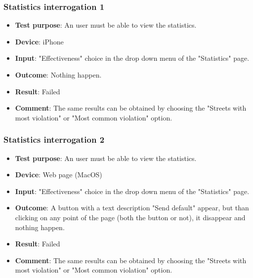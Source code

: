 \documentclass[../ATD.tex]{subfiles}
\begin{document}
    \subsubsection{Statistics interrogation 1}\label{subsubsec:statistics-interrogation-1}
    \begin{itemize}
        \item \textbf{Test purpose}: An user must be able to view the statistics.
        \item \textbf{Device}: iPhone
        \item \textbf{Input}: "Effectiveness" choice in the drop down menu of the "Statistics" page.
        \item \textbf{Outcome}: Nothing happen.
        \item \textbf{Result}: Failed
        \item \textbf{Comment}: The same results can be obtained by choosing the "Streets with most violation" or "Most common violation" option.
    \end{itemize}

    \subsubsection{Statistics interrogation 2}\label{subsubsec:statistics-interrogation-2}
    \begin{itemize}
        \item \textbf{Test purpose}: An user must be able to view the statistics.
        \item \textbf{Device}: Web page (MacOS)
        \item \textbf{Input}: "Effectiveness" choice in the drop down menu of the "Statistics" page.
        \item \textbf{Outcome}: A button with a text description "Send default" appear, but than clicking on any point of the page (both the button or not), it disappear and nothing happen.
        \item \textbf{Result}: Failed
        \item \textbf{Comment}: The same results can be obtained by choosing the "Streets with most violation" or "Most common violation" option.
    \end{itemize}
\end{document}
